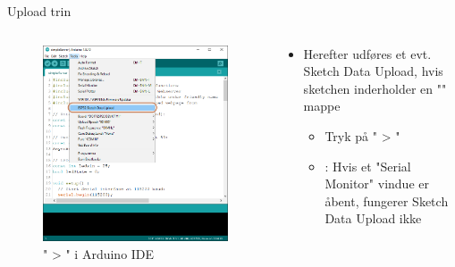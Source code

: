 \documentclass[aspectratio=169]{beamer}
\begin{document}
\begin{frame}{Upload trin}
\begin{columns}

	\begin{column}{0.5\textwidth}
		\begin{figure}
  			\includegraphics[height=0.6\textheight,keepaspectratio=true]{assets/pictures/ESP32-sketchdata-marked.png}
  			\caption{" > " i Arduino IDE}
  			\label{fig:ESP32-sketchdata-marked}
		\end{figure}
	\end{column}

	\begin{column}{0.5\textwidth}
		\begin{textBox}
			\begin{itemize}
				\item Herefter udføres et evt. Sketch Data Upload, hvis sketchen inderholder en "" mappe
				\begin{itemize}
					\item Tryk på " > "
					\item {}: Hvis et "Serial Monitor" vindue er åbent, fungerer Sketch Data Upload ikke
				\end{itemize}
			\end{itemize}
		\end{textBox}
	\end{column}

\end{columns}
\end{frame}
\end{document}
